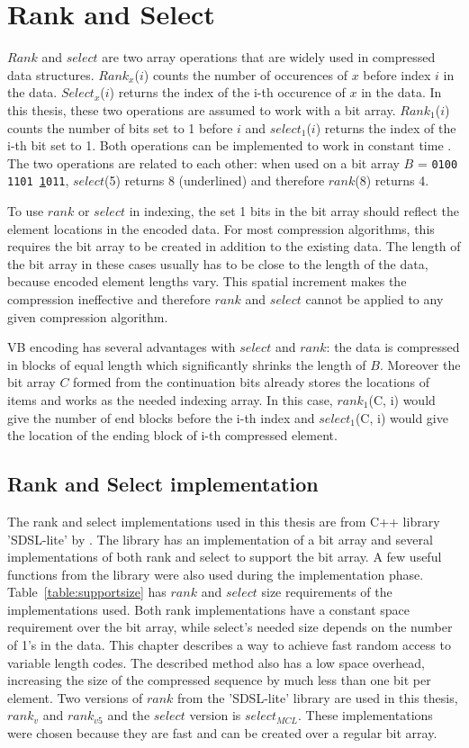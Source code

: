 \chapter{Rank and Select}
$Rank$ and $select$ are two array operations that are widely used in compressed data structures. $Rank_x$($i$) counts the number of occurences of $x$ before index $i$ in the data. $Select_x$($i$) returns the index of the i-th 
occurence of $x$ in the data. In this thesis, these two operations are assumed to work with a bit array. $Rank_1$($i$) counts the number of bits set to 1 before $i$ and $select_1$($i$) returns the index 
of the i-th bit set to 1. Both operations can be implemented to work in constant time \citep[see, e.g.,][]{gbmp2014sea}. The two operations are related to each other: when used on a bit array 
$B$ = \texttt{0100 1101 \underline{1}011}, $select$(5) returns 8 (underlined) and therefore $rank$(8) returns 4. 

To use $rank$ or $select$ in indexing, the set 1 bits in the bit array should reflect the element locations in the encoded data. For most compression algorithms, this requires the bit array to be 
created in addition to the existing data. The length of the bit array in these cases usually has to be close to the length of the data, because encoded element lengths vary. This spatial increment makes 
the compression ineffective and therefore $rank$ and $select$ cannot be applied to any given compression algorithm.

VB encoding has several advantages with $select$ and $rank$: the data is compressed in 
blocks of equal length which significantly shrinks the length of $B$. Moreover the bit array $C$ formed from the continuation bits already stores the locations of items and works
as the needed indexing array. In this case, $rank_1$(C, i) would give the number of end blocks before the i-th index and $select_1$(C, i) would give the location of the ending block 
of i-th compressed element.

\section{Rank and Select implementation}

The rank and select implementations used in this thesis are from C++ library 'SDSL-lite' by \citep{gbmp2014sea}. The library has an implementation of a bit array and several implementations
 of both rank and select to support the bit array. A few useful functions from the library were also used during the implementation phase. Table~\ref{table:supportsize} has $rank$ and $select$ 
size requirements of the implementations used. Both rank implementations have a constant space requirement over the bit array, while select's needed size depends on 
the number of 1's in the data. This chapter describes a way to achieve fast random access to variable length codes. The described method also has a low space overhead, increasing the size of the 
compressed sequence by much less than one bit per element. Two versions of $rank$ from the 'SDSL-lite' library are used in this thesis, $rank_v$ and $rank_{v5}$ and the $select$ version is $select_{MCL}$. 
These implementations were chosen because they are fast and can be created over a regular bit array.

